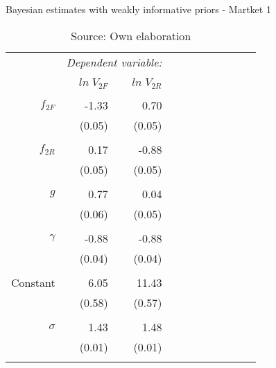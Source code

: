 \begin{table}[ht]
\caption{Bayesian estimates with weakly informative priors - Martket 1}
\centering
\begin{tabular}{rrrrrrrrrrr}
  \toprule 
 & \multicolumn{2}{c}{\textit{Dependent variable:}} \\ 
\cline{2-3} 
\\[-1.8ex] & $ln \; V_{2F}$ & $ln \; V_{2R}$ \\ 
\hline \\[-1.8ex] 

  $f_{2F}$ &-1.33  & 0.70\\
  		     & (0.05)  & (0.05) \\
& & \\
  $f_{2R}$ & 0.17 &  -0.88\\
  			   & (0.05) &  (0.05) \\
& & \\  
  $g$ & 0.77 & 0.04 \\
  		& (0.06) & (0.05) \\
& & \\
  $\gamma$ & -0.88  &  -0.88\\
  			& (0.04) & (0.04) \\
& & \\  
  Constant & 6.05  & 11.43 \\
  			& (0.58) & (0.57) \\
& & \\  
  \hline
  $\sigma$ & 1.43 & 1.48 \\
  		 & (0.01) & (0.01) \\
& & \\
\bottomrule
\end{tabular}
\caption*{Source: Own elaboration}
\end{table}
